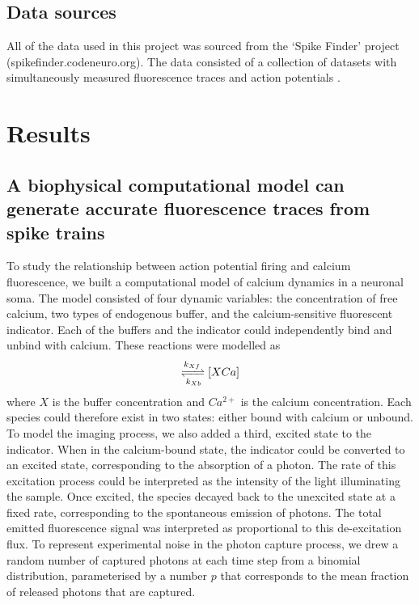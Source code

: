 \subsection{Data sources}
All of the data used in this project was sourced from the ‘Spike Finder’ project \\ (spikefinder.codeneuro.org). The data consisted of a collection of datasets with simultaneously measured fluorescence traces and action potentials  \parencite{berens}.

\section{Results}
\subsection{A biophysical computational model can generate accurate fluorescence traces from spike trains}
To study the relationship between action potential firing and calcium fluorescence, we built a computational model of calcium dynamics in a neuronal soma. The model consisted of four dynamic variables: the concentration of free calcium, two types of endogenous buffer, and the calcium-sensitive fluorescent indicator. Each of the buffers and the indicator could independently bind and unbind with calcium. These reactions were modelled as
\begin{align*}
   [X][Ca^{2+}] \xrightleftharpoons[k_{Xb}]{k_{Xf}} [XCa]
\end{align*}
where $X$ is the buffer concentration and $Ca^{2+}$ is the calcium concentration. Each species could therefore exist in two states: either bound with calcium or unbound. To model the imaging process, we also added a third, excited state to the indicator. When in the calcium-bound state, the indicator could be converted to an excited state, corresponding to the absorption of a photon. The rate of this excitation process could be interpreted as the intensity of the light illuminating the sample. Once excited, the species decayed back to the unexcited state at a fixed rate, corresponding to the spontaneous emission of photons. The total emitted fluorescence signal was interpreted as proportional to this de-excitation flux. To represent experimental noise in the photon capture process, we drew a random number of captured photons at each time step from a binomial distribution, parameterised by a number $p$ that corresponds to the mean fraction of released photons that are captured.

